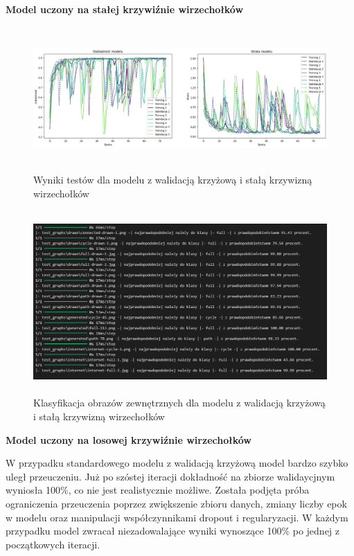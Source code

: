 \textbf{Model uczony na stałej krzywiźnie wirzechołków}

\begin{figure}[ht]
	\centering
	\includegraphics[height=5.5cm]{resources/tests/images/v2/crossvalid_img.png}
	\caption{Wyniki testów dla modelu z walidacją krzyżową i stałą krzywizną wirzechołków}
	\label{Fig:tests-cv-1}
\end{figure}
\FloatBarrier

\begin{figure}[ht]
	\centering
	\includegraphics[height=7cm]{resources/tests/images/v2/crossvalid_txt.png}
	\caption{Klasyfikacja obrazów zewnętrznych dla modelu z walidacją krzyżową i stałą krzywizną wirzechołków}
	\label{Fig:tests-cv-2}
\end{figure}
\FloatBarrier

\textbf{Model uczony na losowej krzywiźnie wirzechołków}

W przypadku standardowego modelu z walidacją krzyżową model bardzo szybko uległ przeuczeniu.
Już po szóstej iteracji dokładność na zbiorze walidaycjnym wyniosła 100\%, co nie jest realistycznie możliwe.
Została podjęta próba ograniczenia przeuczenia poprzez zwiększenie zbioru danych, zmiany liczby epok w modelu
oraz manipulacji współczynnikami dropout i regularyzacji.
W każdym przypadku model zwracał niezadowalające wyniki wynoszące 100\% po jednej z początkowych iteracji.

